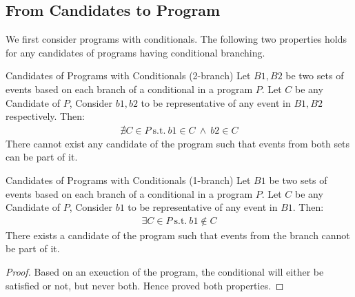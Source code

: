 \subsection{From Candidates to Program}

    We first consider programs with conditionals. The following two properties holds for any candidates of programs having conditional branching. 

    \begin{property}{Candidates of Programs with Conditionals (2-branch)}
        \label{CondB2}
        Let $B1,B2$ be two sets of events based on each branch of a conditional in a program $P$. Let $C$ be any Candidate of $P$, Consider $b1,b2$ to be representative of any event in $B1,B2$ respectively. Then:
        \begin{align*}
            \nexists C \in P \ \text{s.t.} \ b1 \in C \ \wedge \ b2 \in C 
        \end{align*}
        There cannot exist any candidate of the program such that events from both sets can be part of it. 
    \end{property}

    \begin{property}{Candidates of Programs with Conditionals (1-branch)}
        \label{CondB1}
        Let $B1$ be two sets of events based on each branch of a conditional in a program $P$. Let $C$ be any Candidate of $P$, Consider $b1$ to be representative of any event in $B1$. Then:
        \begin{align*}
            \exists C \in P \ \text{s.t.} \ b1 \notin C  
        \end{align*}
        There exists a candidate of the program such that events from the branch cannot be part of it. 
    \end{property}



    \begin{proof}
        Based on an exeuction of the program, the conditional will either be satisfied or not, but never both. Hence proved both properties. 
    \end{proof}

